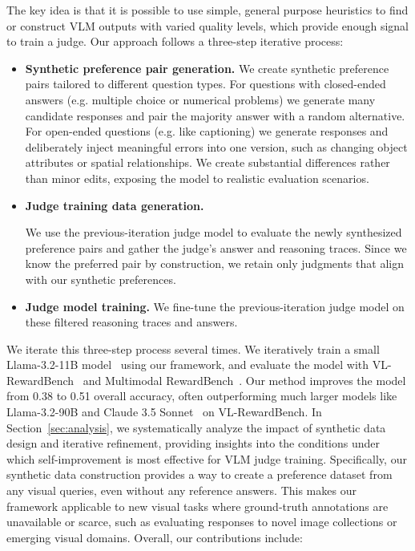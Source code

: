 The key idea is that it is possible to use simple, general purpose heuristics to find or construct VLM outputs with varied quality levels, which provide enough signal to train a judge.  Our approach follows a three-step iterative process:
\begin{itemize}[noitemsep,topsep=0pt,leftmargin=*]
  \item \textbf{Synthetic preference pair generation.} We create synthetic preference pairs tailored to different question types. For questions with closed-ended answers (e.g. multiple choice or numerical problems) we generate many candidate responses and pair the majority answer with a random alternative. For open-ended questions (e.g. like captioning) we generate responses and deliberately inject meaningful errors into one version, such as changing object attributes or spatial relationships. We create substantial differences rather than minor edits, exposing the model to realistic evaluation scenarios.
  \item \textbf{Judge training data generation.} 
 
We use the previous-iteration judge model to evaluate the newly synthesized preference pairs and gather the judge's answer and reasoning traces.
Since we know the preferred pair by construction, we retain only judgments that align with our synthetic preferences.
  \item \textbf{Judge model training.} We fine-tune the previous-iteration judge model on these filtered reasoning traces and answers. 
\end{itemize}
We iterate this three-step process several times. We iteratively train a small Llama-3.2-11B model~\cite{llama3} using our framework, and evaluate the model with VL-RewardBench~\cite{vlrb} and Multimodal RewardBench~\cite{mmrb}. Our method improves the model from 0.38 to 0.51 overall accuracy, often outperforming much larger models like Llama-3.2-90B and Claude 3.5 Sonnet~\cite{claude} on VL-RewardBench.
In Section~\ref{sec:analysis}, we systematically analyze the impact of synthetic data design and iterative refinement, providing insights into the conditions under which self-improvement is most effective for VLM judge training. 
Specifically, our synthetic data construction provides a way to create a preference dataset from any visual queries, even without any reference answers.
This makes our framework applicable to new visual tasks where ground-truth annotations are unavailable or scarce, such as evaluating responses to novel image collections or emerging visual domains. Overall, our contributions include:
